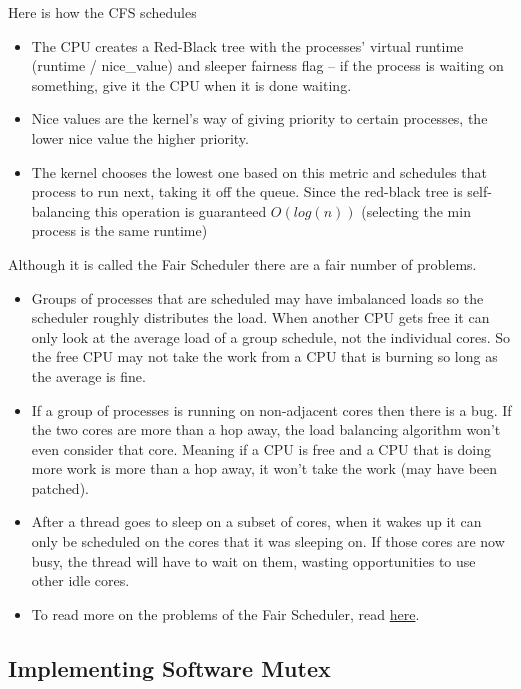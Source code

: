 Here is how the CFS schedules

\begin{itemize}
\tightlist
\item
  The CPU creates a Red-Black tree with the processes' virtual runtime (runtime / nice\_value) and sleeper fairness flag -- if the process is waiting on something, give it the CPU when it is done waiting.
\item
  Nice values are the kernel's way of giving priority to certain processes, the lower nice value the higher priority.
\item
  The kernel chooses the lowest one based on this metric and schedules that process to run next, taking it off the queue. Since the red-black tree is self-balancing this operation is guaranteed \(O(log(n))\) (selecting the min process is the same runtime)
\end{itemize}

Although it is called the Fair Scheduler there are a fair number of problems.

\begin{itemize}
\tightlist
\item
  Groups of processes that are scheduled may have imbalanced loads so the scheduler roughly distributes the load. When another CPU gets free it can only look at the average load of a group schedule, not the individual cores. So the free CPU may not take the work from a CPU that is burning so long as the average is fine.
\item
  If a group of processes is running on non-adjacent cores then there is a bug. If the two cores are more than a hop away, the load balancing algorithm won't even consider that core. Meaning if a CPU is free and a CPU that is doing more work is more than a hop away, it won't take the work (may have been patched).
\item
  After a thread goes to sleep on a subset of cores, when it wakes up it can only be scheduled on the cores that it was sleeping on. If those cores are now busy, the thread will have to wait on them, wasting opportunities to use other idle cores.
\item
  To read more on the problems of the Fair Scheduler, read \href{https://blog.acolyer.org/2016/04/26/the-linux-scheduler-a-decade-of-wasted-cores}{here}.
\end{itemize}


\subsection{Implementing Software Mutex}

